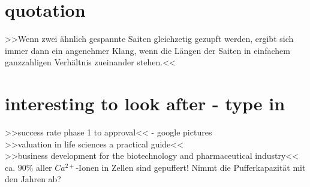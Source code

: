 \documentclass[12pt,a4paper,bibliography=totocnumbered]{scrartcl}
\begin{document}
\section{quotation}
>>Wenn zwei ähnlich gespannte Saiten gleichzetig gezupft werden, ergibt sich immer dann ein angenehmer Klang, wenn die Längen der Saiten in einfachem ganzzahligen Verhältnis zueinander stehen.<<
\section{interesting to look after - type in}
>>success rate phase 1 to approval<< - google pictures\\
>>valuation in life sciences a practical guide<<\\
>>business development for the biotechnology and pharmaceutical industry<<\\
ca. $90 \%$ aller $Ca^{2+}$-Ionen in Zellen sind gepuffert! Nimmt die Pufferkapazität mit den Jahren ab?

	 
	\renewcommand{\refname}{Literaturverzeichnis} 
	\newpage
\end{document}

